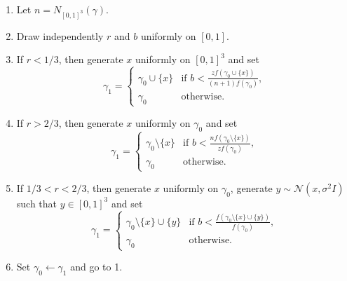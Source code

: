 \begin{enumerate}
	\item Let $n = N_{[0,1]^3}(\gamma)$.
    \item Draw independently $r$ and $b$ uniformly on $[0,1]$.
    \item If $r<1/3$, then generate $x$ uniformly on $[0,1]^3$ and set
        \begin{equation}\label{Dbirth}
        \gamma_1 = 
        \left\{
            \begin{array}{ll}
                \gamma_0 \cup \{x\} & \mbox{if }  b < \frac{z f(\gamma_0 \cup \{x\})}{(n+1)f(\gamma_0)}, \\
                \gamma_0 & \mbox{otherwise. }
            \end{array}
        \right. 
        \end{equation}
    \item If $r>2/3$, then generate $x$ uniformly on $\gamma_0$ and set
        \begin{equation}\label{Ddeath}
        \gamma_1 = 
        \left\{
            \begin{array}{ll}
                \gamma_0 \setminus \{x\} & \mbox{if }  b < \frac{n f(\gamma_0 \setminus \{x\})}{zf(\gamma_0)}, \\
                \gamma_0 & \mbox{otherwise. }
            \end{array}
        \right. 
        \end{equation}
    \item If $1/3 < r < 2/3$, then generate $x$ uniformly on $\gamma_0$, generate $y\sim \mathcal N (x, \sigma^2 I)$ such that $y \in [0,1]^3$ and set
        \begin{equation}\label{Dmove}
        \gamma_1 = 
        \left\{
            \begin{array}{ll}
                \gamma_0 \setminus \{x\} \cup \{y\} & \mbox{if }  b < \frac{f(\gamma_0 \setminus \{x\} \cup \{y\})}{f(\gamma_0)}, \\
                \gamma_0 & \mbox{otherwise. }
            \end{array}
        \right. 
        \end{equation}
    \item Set $\gamma_0 \leftarrow \gamma_1$ and go to 1.
\end{enumerate}

